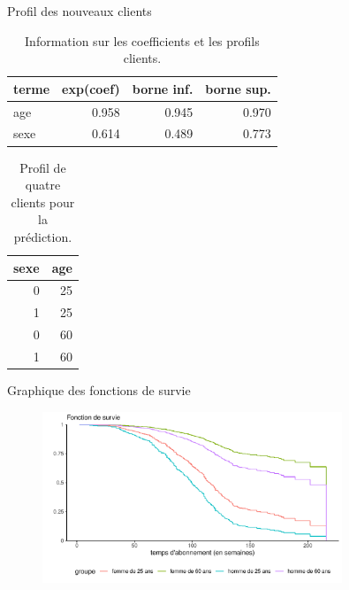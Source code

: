 \documentclass[
  ignorenonframetext,
]{beamer}
\begin{document}
\begin{frame}{Profil des nouveaux clients}
\protect\hypertarget{profil-des-nouveaux-clients}{}
\hypertarget{tbl-survie-coefs}{}
\begin{table}
\caption{\label{tbl-survie-coefs}Information sur les coefficients et les profils clients. }\tabularnewline

\centering
\begin{tabular}{lrrr}
\toprule
terme & exp(coef) & borne inf. & borne sup.\\
\midrule
age & 0.958 & 0.945 & 0.970\\
sexe & 0.614 & 0.489 & 0.773\\
\bottomrule
\end{tabular}
\end{table}

\hypertarget{tbl-profils}{}
\begin{table}
\caption{\label{tbl-profils}Profil de quatre clients pour la prédiction. }\tabularnewline

\centering
\begin{tabular}{rr}
\toprule
sexe & age\\
\midrule
0 & 25\\
1 & 25\\
0 & 60\\
1 & 60\\
\bottomrule
\end{tabular}
\end{table}
\end{frame}

\begin{frame}{Graphique des fonctions de survie}
\protect\hypertarget{graphique-des-fonctions-de-survie}{}
\begin{figure}

{\centering \includegraphics[width=0.8\textwidth,height=\textheight]{MATH60602-diapos8_files/figure-beamer/unnamed-chunk-20-1.pdf}

}

\end{figure}
\end{frame}
\end{document}
